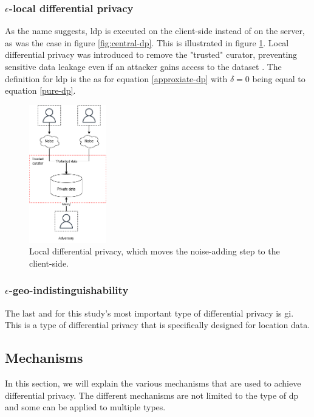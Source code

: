 \subsubsection{$\epsilon$-local differential privacy}
As the name suggests, \gls{ldp} is executed on the client-side instead of on the server, as was the case in figure \ref{fig:central-dp}.
This is illustrated in figure \ref{fig:local-dp}.
Local differential privacy was introduced to remove the "trusted" curator, preventing sensitive data leakage even if an attacker gains access to the dataset \citep{del_rey_comprehensive_2020-1}.
The definition for \gls{ldp} is the as for equation \ref{approxiate-dp} with $\delta = 0$ being equal to equation \ref{pure-dp}.
\begin{figure}[h]
  \includegraphics[width=0.3\textwidth]{TheorethicalFramework/Differential privacy/master-thesis-Pagina-8.png}
  \caption{Local differential privacy, which moves the noise-adding step to the client-side.}
  \label{fig:local-dp}
\end{figure}
\subsubsection{$\epsilon$-geo-indistinguishability}
The last and for this study's most important type of differential privacy is \gls{gi}.
This is a type of differential privacy that is specifically designed for location data.

\subsection{Mechanisms}
In this section, we will explain the various mechanisms that are used to achieve differential privacy.
The different mechanisms are not limited to the type of \gls{dp} and some can be applied to multiple types.
